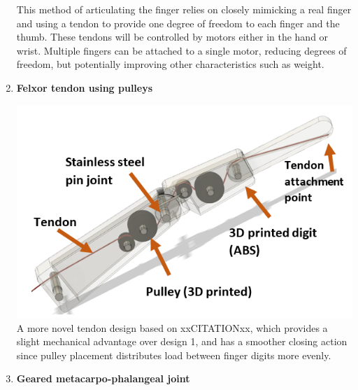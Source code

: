 \documentclass[12pt,3p]{report}
\begin{document}
\begin{multicols}{2}
\begin{enumerate}
{				This method of articulating the finger relies on closely mimicking a real finger and using a tendon to provide one degree of freedom to each finger and the thumb. These tendons will be controlled by motors either in the hand or wrist. Multiple fingers can be attached to a single motor, reducing degrees of freedom, but potentially improving other characteristics such as weight.
				
			}
			\item \textbf{Felxor tendon using pulleys} {
							
				\includegraphics[scale=0.5]{pulley.PNG}
				A more novel tendon design based on xxCITATIONxx, which provides a slight mechanical advantage over design 1, and has a smoother closing action since pulley placement distributes load between finger digits more evenly. 
			}
\pagebreak			
			
			\item \textbf{Geared metacarpo-phalangeal joint} {
			
}
\end{enumerate}
\end{multicols}
\end{document}
